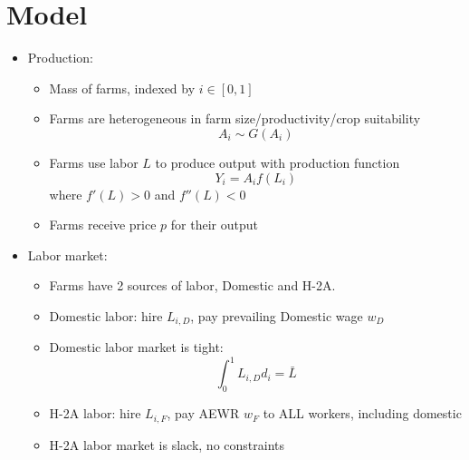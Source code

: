\documentclass[14pt]{article}
\begin{document}
\section{Model}
\begin{itemize}
    \item Production:
    \begin{itemize}
        \item Mass of farms, indexed by \(i \in [0, 1] \)
        \item Farms are heterogeneous in farm size/productivity/crop suitability
        \[ A_i \sim G(A_i)\]
        \item Farms use labor \(L\) to produce output with production function
        \[ Y_i = A_i f(L_i) \]
        where \(f'(L) > 0\) and \(f''(L) < 0\)
        \item Farms receive price \(p\) for their output
    \end{itemize}
    \item Labor market:
    \begin{itemize}
        \item Farms have 2 sources of labor, Domestic and H-2A.
        \item Domestic labor: hire \(L_{i,D}\), pay prevailing Domestic wage \(w_D\)
        \item Domestic labor market is tight:
        \[ \int_0^{1} L_{i,D} d_i = \bar{L} \]
        \item H-2A labor: hire \(L_{i, F}\), pay AEWR \(w_F\) to ALL workers, including domestic
        \item H-2A labor market is slack, no constraints
    \end{itemize}
\end{itemize}
\end{document}
